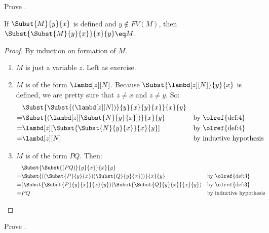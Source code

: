 \documentclass[../../../include/open-logic-section]{subfiles}
\begin{document}
\begin{prob}
  Prove .
\end{prob}


\begin{thm}
  If $\Subst{M}{y}{x}$ is defined and $y \notin FV(M)$, then $\Subst{\Subst{M}{y}{x}}{x}{y} \eq M$.
\end{thm}
\begin{proof}
  By induction on formation of $M$.
  \begin{enumerate}
  \item $M$ is just a variable $z$. Left as exercise. 
  \item $M$ is of the form $\lambd[z][N]$. Because
    $\Subst{\lambd[z][N]}{y}{x}$ is defined, we are pretty sure
    that $z \neq x$ and $z \neq y$. So:
    \begin{align*}
      &\Subst{\Subst{(\lambd[z][N])}{y}{x}{y}{x}}{x}{y}\\
      =&\Subst{(\lambd[z][\Subst{N}{y}{x}])}{x}{y}
       && \text{by \olref{def:4}} \\
      =&\lambd[z][\Subst{\Subst{N}{y}{x}}{x}{y}]
       && \text{by \olref{def:4}} \\
      =&\lambd[z][N] && \text{by inductive hypothesis} 
    \end{align*}
  \item $M$ is of the form $PQ$. Then:
    \begin{align*}
      &\Subst{\Subst{(PQ)}{y}{x}}{x}{y} \\
      =&\Subst{((\Subst{P}{y}{x})(\Subst{Q}{y}{x}))}{x}{y}
         && \text{by \olref{def:3}} \\
      =&(\Subst{\Subst{P}{y}{x}}{x}{y})(\Subst{\Subst{Q}{y}{x}}{x}{y})
         && \text{by \olref{def:3}} \\
      =&PQ &&\text{by inductive hypothesis}
    \end{align*}
  \end{enumerate}
\end{proof}
\begin{prob}
  Prove .
\end{prob}
\end{document}
